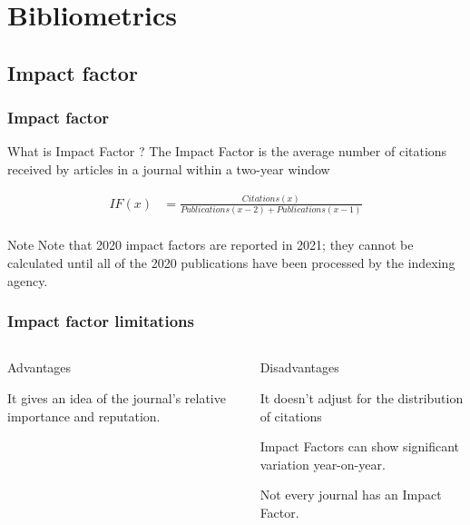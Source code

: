 \documentclass{beamer}
\begin{document}
\section{Bibliometrics}

\subsection{Impact factor}
\begin{frame}
    \frametitle{Impact factor}

        \begin{block}{What is Impact Factor ?}
        The Impact Factor is the average number of citations received by articles in a journal within a two-year window
    \end{block}
    \begin{align*}
        IF(x) &= \frac{ Citations(x)}{ Publications(x - 2 ) +  Publications(x - 1) }\\
    \end{align*}
    
    \begin{alertblock}{Note}
      Note that 2020 impact factors are reported in 2021; they cannot be calculated until all of the 2020 publications have been processed by the indexing agency.
    \end{alertblock}


\end{frame}
\begin{frame}
    \frametitle{Impact factor limitations}
    \begin{columns}[T]
        \begin{column}{.5\textwidth} \pause
            \centering Advantages
            \begin{propslist}
                \item It gives an idea of the journal’s relative importance and reputation. \pause
            \end{propslist}
        \end{column}
        \begin{column}{.5\textwidth}
            \centering Disadvantages %
            \begin{conslist}
                \item It doesn’t adjust for the distribution of citations \pause
                \item Impact Factors can show significant variation year-on-year.  \pause
                \item Not every journal has an Impact Factor.  \pause
            \end{conslist}
        \end{column}
    \end{columns}
\end{frame}
\end{document}
